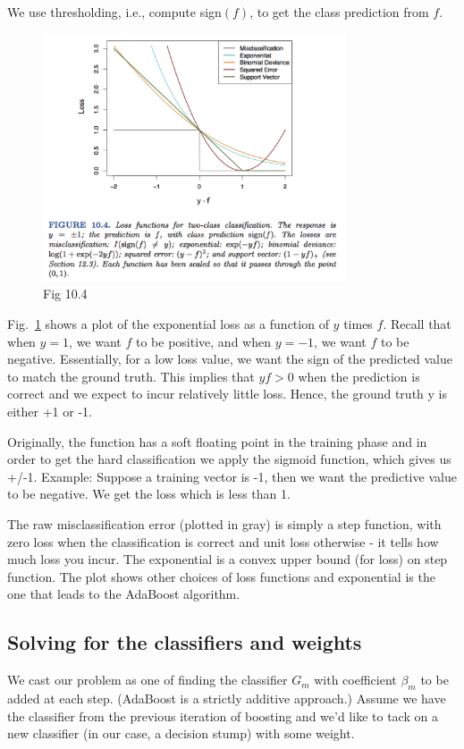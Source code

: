 \documentclass[a4paper]{article}
\begin{document}
We use thresholding, i.e., compute sign$(f)$, to get the class prediction from $f$. 
\begin{figure}
\centering
\includegraphics[width=0.8\textwidth]{fig10_4.png}
\caption{\label{fig:boost2}Fig 10.4}
\end{figure}

Fig.~\ref{fig:boost2} shows a plot of the exponential loss as a function of $y$ times $f$.
Recall that when $y=1$, we want $f$ to be positive, and when $y=-1$, we want $f$ to be negative.  Essentially, for a low loss value, we want the sign of the predicted value to match the ground truth. This implies that $yf>0$ when the prediction is correct and we expect to incur relatively little loss. Hence, the ground truth y is either +1 or -1. 

Originally, the function has a soft floating point in the training phase and in order to get the hard classification we apply the sigmoid function, which gives us +/-1. Example: Suppose a training vector is -1, then we want the predictive value to be negative.  We get the loss which is less than 1.

The raw misclassification error (plotted in gray) is simply a step function, with zero loss when the classification is correct and unit loss otherwise - it tells how much loss you incur.  The exponential is a convex upper bound (for loss) on step function. The plot shows other choices of loss functions and exponential is the one that leads to the AdaBoost algorithm.

\subsection{Solving for the classifiers and weights}
We cast our problem as one of finding the classifier $G_m$ with coefficient $\beta_m$ to be added at each step. (AdaBoost is a strictly additive approach.) Assume we have the classifier from the previous iteration of boosting and we'd like to tack on a new classifier (in our case, a decision stump) with some weight.
\end{document}
